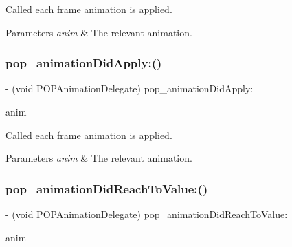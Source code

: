 Called each frame animation is applied. 
\begin{DoxyParams}{Parameters}
{\em anim} & The relevant animation. \\
\hline
\end{DoxyParams}
\mbox{\label{protocol_p_o_p_animation_delegate_01-p_ae6bba4e873d7baaad2d6e27e06a5c6d4}} 
\subsubsection{\texorpdfstring{pop\+\_\+animation\+Did\+Apply\+:()}{pop\_animationDidApply:()}\hspace{0.1cm}{\footnotesize\ttfamily [3/3]}}
{\footnotesize\ttfamily -\/ (void P\+O\+P\+Animation\+Delegate) pop\+\_\+animation\+Did\+Apply\+: \begin{DoxyParamCaption}\item[{(\mbox{\hyperlink{interface_p_o_p_animation}{P\+O\+P\+Animation}} $\ast$)}]{anim }\end{DoxyParamCaption}\hspace{0.3cm}{\ttfamily [optional]}}

Called each frame animation is applied. 
\begin{DoxyParams}{Parameters}
{\em anim} & The relevant animation. \\
\hline
\end{DoxyParams}
\mbox{\label{protocol_p_o_p_animation_delegate_01-p_a3c4147f706696ad9618d732439c9d0fb}} 
\subsubsection{\texorpdfstring{pop\+\_\+animation\+Did\+Reach\+To\+Value\+:()}{pop\_animationDidReachToValue:()}\hspace{0.1cm}{\footnotesize\ttfamily [1/3]}}
{\footnotesize\ttfamily -\/ (void P\+O\+P\+Animation\+Delegate) pop\+\_\+animation\+Did\+Reach\+To\+Value\+: \begin{DoxyParamCaption}\item[{(\mbox{\hyperlink{interface_p_o_p_animation}{P\+O\+P\+Animation}} $\ast$)}]{anim }\end{DoxyParamCaption}\hspace{0.3cm}{\ttfamily [optional]}}

